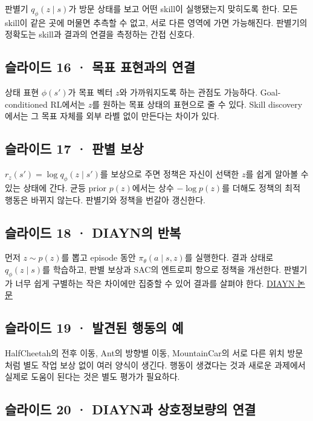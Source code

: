 \documentclass[11pt,a4paper]{article}
\begin{document}
판별기 $q_\phi(z\mid s)$가 방문 상태를 보고 어떤 skill이 실행됐는지 맞히도록 한다. 모든 skill이 같은 곳에 머물면 추측할 수 없고, 서로 다른 영역에 가면 가능해진다. 판별기의 정확도는 skill과 결과의 연결을 측정하는 간접 신호다.\par

\subsection{슬라이드 16 · 목표 표현과의 연결}

상태 표현 $\phi(s')$가 목표 벡터 $z$와 가까워지도록 하는 관점도 가능하다. Goal-conditioned RL에서는 $z$를 원하는 목표 상태의 표현으로 줄 수 있다. Skill discovery에서는 그 목표 자체를 외부 라벨 없이 만든다는 차이가 있다.\par

\subsection{슬라이드 17 · 판별 보상}

$r_z(s')=\log q_\phi(z\mid s')$를 보상으로 주면 정책은 자신이 선택한 $z$를 쉽게 알아볼 수 있는 상태에 간다. 균등 prior $p(z)$에서는 상수 $-\log p(z)$를 더해도 정책의 최적 행동은 바뀌지 않는다. 판별기와 정책을 번갈아 갱신한다.\par

\subsection{슬라이드 18 · DIAYN의 반복}

먼저 $z\sim p(z)$를 뽑고 episode 동안 $\pi_\theta(a\mid s,z)$를 실행한다. 결과 상태로 $q_\phi(z\mid s)$를 학습하고, 판별 보상과 SAC의 엔트로피 항으로 정책을 개선한다. 판별기가 너무 쉽게 구별하는 작은 차이에만 집중할 수 있어 결과를 살펴야 한다. \href{https://arxiv.org/abs/1802.06070}{DIAYN 논문}\par

\subsection{슬라이드 19 · 발견된 행동의 예}

HalfCheetah의 전후 이동, Ant의 방향별 이동, MountainCar의 서로 다른 위치 방문처럼 별도 작업 보상 없이 여러 양식이 생긴다. 행동이 생겼다는 것과 새로운 과제에서 실제로 도움이 된다는 것은 별도 평가가 필요하다.\par

\subsection{슬라이드 20 · DIAYN과 상호정보량의 연결}
\end{document}
